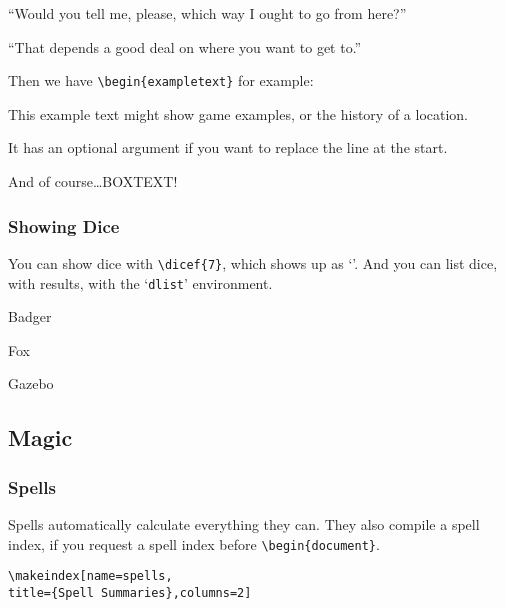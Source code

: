 \documentclass[a4paper,openany]{book}
\begin{document}
\begin{multicols}{2}
\begin{speechtext}
  ``Would you tell me, please, which way I ought to go from here?''

  ``That depends a good deal on where you want to get to.''

\end{speechtext}

Then we have \verb"\begin{exampletext}" for example:

\begin{exampletext}
  This example text might show game examples, or the history of a location.

  It has an optional argument if you want to replace the line at the start.

\end{exampletext}

\begin{boxtext}
  And of course\ldots BOXTEXT!

\end{boxtext}

\subsubsection{Showing Dice}

You can show dice with \verb"\dicef{7}", which shows up as `'.
And you can list dice, with results, with the `\texttt{dlist}' environment.

\begin{dlist}
  \item Badger
  \item Fox
  \item Gazebo
\end{dlist}

\subsection{Magic}

\subsubsection{Spells}

Spells automatically calculate everything they can.
They also compile a spell index, if you request a spell index before \verb"\begin{document}".

\begin{verbatim}
\makeindex[name=spells,
title={Spell Summaries},columns=2]


\end{verbatim}
\end{multicols}
\end{document}

